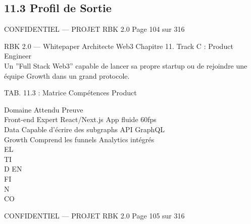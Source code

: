 \subsection{11.3 Profil de Sortie}
\vspace{0.5em}
\begin{confidential}CONFIDENTIEL — PROJET RBK 2.0                               Page 104 sur 316\end{confidential}
RBK 2.0 — Whitepaper Architecte Web3                                                                 Chapitre 11. Track C : Product Engineer\\
\vspace{0.5em}
\vspace{0.5em}
\vspace{0.5em}
Un ”Full Stack Web3” capable de lancer sa propre startup ou de rejoindre une équipe Growth dans un grand protocole.\\
\vspace{0.5em}
\begin{center}\begin{tabular}TAB. 11.3 : Matrice Compétences Product\end{tabular}\end{center}
\vspace{0.5em}
\vspace{0.5em}
Domaine Attendu                          Preuve\\
Front-end Expert React/Next.js           App fluide 60fps\\
Data      Capable d’écrire des subgraphs API GraphQL\\
Growth    Comprend les funnels           Analytics intégrés\\
\vspace{0.5em}
\vspace{0.5em}
\vspace{0.5em}
\vspace{0.5em}
EL\\
TI\\
D   EN\\
FI\\
N\\
CO\\
\vspace{0.5em}
\vspace{0.5em}
\vspace{0.5em}
\vspace{0.5em}
\begin{confidential}CONFIDENTIEL — PROJET RBK 2.0                               Page 105 sur 316\end{confidential}
